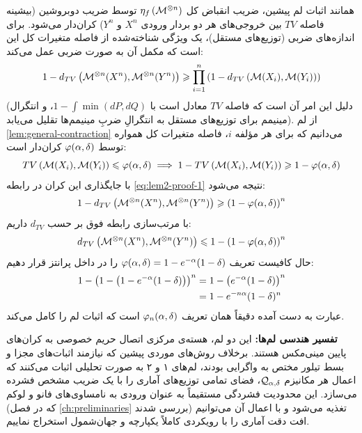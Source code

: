 \begin{اثبات}
همانند اثبات لم پیشین، ضریب انقباض کل $\eta_f\left( \mech^{\otimes n} \right)$ توسط ضریب دوبروشین (بیشینه فاصله $TV$ بین خروجی‌های هر دو بردار ورودی $X^n$ و $Y^n$) کران‌دار می‌شود.
برای اندازه‌های ضربی (توزیع‌های مستقل)، یک ویژگی شناخته‌شده از فاصله متغیرات کل این است که مکمل آن به صورت ضربی عمل می‌کند:
\begin{equation}
\label{eq:lem2-proof-1}
1 - d_{TV}\left( \mech^{\otimes n}(X^n), \mech^{\otimes n}(Y^n) \right) \gee \prod_{i=1}^{n} \left( 1 - d_{TV}\left( \mech(X_i), \mech(Y_i) \right) \right)
\end{equation}
(دلیل این امر آن است که فاصله $TV$ معادل است با $1 - \int \min(dP, dQ)$، و انتگرال مینیمم برای توزیع‌های مستقل به انتگرالِ ضربِ مینیمم‌ها تقلیل می‌یابد).
از لم \ref{lem:general-contraction} می‌دانیم که برای هر مؤلفه $i$، فاصله متغیرات کل همواره توسط $\varphi(\alpha, \delta)$ کران‌دار است:
\begin{equation*}
TV\left( \mech(X_i), \mech(Y_i) \right) \lee \vph(\al, \del) \implies 1 - TV\left( \mech(X_i), \mech(Y_i) \right) \gee 1 - \vph(\al, \del)
\end{equation*}
با جایگذاری این کران در رابطه \eqref{eq:lem2-proof-1} نتیجه می‌شود:
\begin{equation}
\label{eq:lem2-proof-2}
1 - d_{TV}\left( \mech^{\otimes n}(X^n), \mech^{\otimes n}(Y^n) \right) \gee \left( 1 - \vph(\al, \del) \right)^n
\end{equation}
با مرتب‌سازی رابطه فوق بر حسب $d_{TV}$ داریم:
\begin{equation}
\label{eq:lem2-proof-3}
d_{TV}\left( \mech^{\otimes n}(X^n), \mech^{\otimes n}(Y^n) \right) \lee 1 - \left( 1 - \vph(\al, \del) \right)^n
\end{equation}
حال کافیست تعریف $\varphi(\alpha, \delta) = 1 - e^{-\alpha}(1 - \delta)$ را در داخل پرانتز قرار دهیم:
\begin{align}
1 - \left( 1 - \left( 1 - e^{-\alpha}(1 - \delta) \right) \right)^n &= 1 - \left( e^{-\alpha}(1 - \delta) \right)^n \nonumber \\
&= 1 - e^{-n\alpha}(1 - \delta)^n \label{eq:lem2-proof-4}
\end{align}
عبارت به دست آمده دقیقاً همان تعریف $\varphi_n(\alpha, \delta)$ است که اثبات لم را کامل می‌کند.
\end{اثبات}

\textbf{تفسیر هندسی لم‌ها:} این دو لم، هسته‌ی مرکزی اتصال حریم خصوصی به کران‌های پایین مینی‌مکس هستند. برخلاف روش‌های موردی پیشین که نیازمند اثبات‌های مجزا و بسط تیلور مختص به واگرایی  بودند، لم‌های ۱ و ۲ به صورت تحلیلی اثبات می‌کنند که اعمال هر مکانیزم $\mathcal{Q}_{\alpha,\delta}$، فضای تمامی توزیع‌های آماری را با یک ضریب مشخص فشرده می‌سازد. این محدودیت فشردگی مستقیماً به عنوان ورودی به نامساوی‌های فانو و لوکم (که در فصل \ref{ch:preliminaries} بررسی شدند) تغذیه می‌شود و با اعمال آن می‌توانیم افت دقت آماری را با رویکردی کاملاً یکپارچه و جهان‌شمول استخراج نماییم.